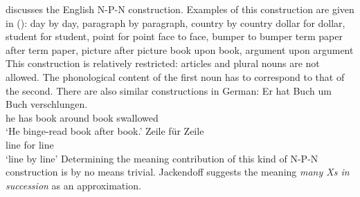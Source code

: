 \begin{exe}
\begin{xlist}[iv.]
\begin{exe}
\begin{xlist}[iv.]
\largerpage
\mbox{}\citet{Jackendoff2008a} discusses the English N-P-N construction. Examples of this construction are given in ():
\eal
\ex day by day, paragraph by paragraph, country by country
\ex dollar for dollar, student for student, point for point
\ex face to face, bumper to bumper
\ex term paper after term paper, picture after picture
\ex book upon book, argument upon argument
\zl
This construction is relatively restricted: articles and plural nouns are not allowed. The phonological content of the first noun has to correspond to that
of the second. There are also similar constructions in German:
\eal
\ex 
\gll Er hat Buch um Buch verschlungen.\\
	 he has book around book swallowed\\
\glt `He binge-read book after book.'
\ex 
\gll Zeile für Zeile\footnotemark\\
	 line for line\\
\glt `line by line'
\zl
Determining the meaning contribution of this kind of N-P-N construction is by no means trivial. Jackendoff suggests the meaning
\emph{many Xs in succession} as an approximation.


\end{xlist}
\end{exe}
\end{xlist}
\end{exe}
